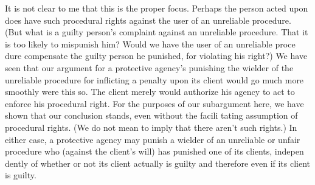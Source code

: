 \documentclass[11pt,openany]{book}
\begin{document}
It is not clear to me that this is the proper focus. Perhaps the person acted upon does have such procedural rights against the user of an unreliable procedure. (But what is a guilty person's complaint against an unreliable procedure. That it is too likely to mispunish him? Would we have the user of an unreliable proce dure compensate the guilty person he punished, for violating his right?) We have seen that our argument for a protective agency's punishing the wielder of the unreliable procedure for inflicting a penalty upon its client would go much more smoothly were this so. The client merely would authorize his agency to act to enforce his procedural right. For the purposes of our subargument here, we have shown that our conclusion stands, even without the facili tating assumption of procedural rights. (We do not mean to imply that there aren't such rights.) In either case, a protective agency may punish a wielder of an unreliable or unfair procedure who (against the client's will) has punished one of its clients, indepen dently of whether or not its client actually is guilty and therefore even if its client is guilty. 
\end{document}
